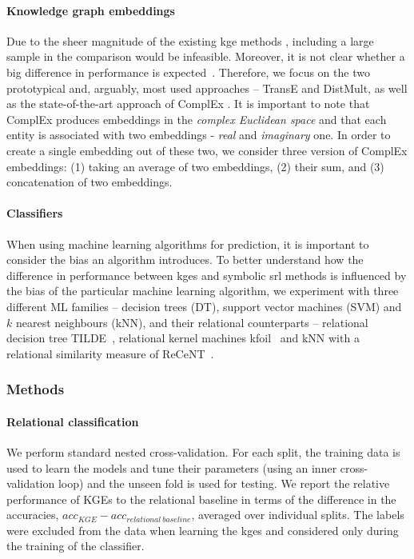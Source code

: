\paragraph{Knowledge graph embeddings}
Due to the sheer magnitude of the existing \gls{kge} methods \cite{EmbeddingsOverview}, including a large sample in the comparison would be infeasible.
Moreover, it is not clear whether a big difference in performance is expected~\cite{DBLP:conf/rep4nlp/KadlecBK17}.
Therefore, we focus on the two prototypical and, arguably, most used approaches -- TransE and DistMult, as well as the state-of-the-art approach of ComplEx \cite{trouillon2016complex}.
It is important to note that ComplEx produces embeddings in the \textit{complex Euclidean space} and that each entity is associated with two embeddings - \textit{real} and \textit{imaginary} one.
In order to create a single embedding out of these two, we consider three version of ComplEx embeddings: (1) taking an average of two embeddings, (2) their sum, and (3) concatenation of two embeddings.




\paragraph{Classifiers}
When using machine learning algorithms for prediction, it is important to consider the bias an algorithm introduces.
To better understand how the difference in performance between \gls{kge}s and symbolic \gls{srl} methods is influenced by the bias of the particular machine learning algorithm, we experiment with three different ML families -- decision trees (DT), support vector machines (SVM) and $k$ nearest neighbours (kNN), and their relational counterparts -- relational decision tree TILDE~\cite{Blockeel1998285}, relational kernel machines \gls{kfoil}~\cite{Landwehr:2006:KLS:1597538.1597601} and kNN with a relational similarity measure of ReCeNT~\cite{Dumancic2017a}.










\subsubsection{Methods}


\paragraph{Relational classification}
We perform standard nested cross-validation.
For each split, the training data is used to learn the models and tune their parameters (using an inner cross-validation loop) and the unseen fold is used for testing.
We report the relative performance of KGEs to the relational baseline in terms of the difference in the accuracies, $acc_{KGE} - acc_{relational~ baseline}$, averaged over individual splits.
The labels were excluded from the data when learning the \gls{kge}s and considered only during the training of the classifier.


